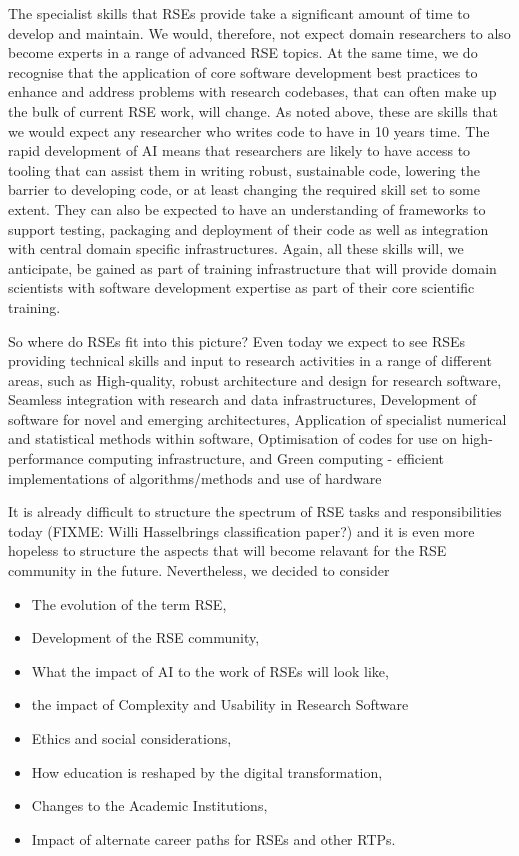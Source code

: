 \documentclass{eceasst}
\begin{document}
The specialist skills that RSEs provide take a significant amount of time to develop and maintain.
We would, therefore, not expect domain researchers to also become experts in a range of
advanced RSE topics. 
At the same time, we do recognise that the application of core software development best practices
to enhance and address problems with research codebases, that can often make up the bulk of
current RSE work, will change. As noted above, these are skills that we
would expect any researcher who writes code to have in 10 years time. 
The rapid development of AI means that researchers are likely to have access to tooling that can assist
them in writing robust, sustainable code, lowering the barrier to developing code, or at least changing the
required skill set to some extent.
They can also be expected to have an understanding of frameworks to support testing, packaging and
deployment of their code as well as integration with central domain specific infrastructures.
Again, all these skills will, we anticipate, be gained as part of training infrastructure that will
provide domain scientists with software development expertise as part of their core scientific training.

So where do RSEs fit into this picture? Even today we expect to see RSEs providing technical skills and input
to research activities in a range of different areas, such as
High-quality, robust architecture and design for research software,
Seamless integration with research and data infrastructures,
Development of software for novel and emerging architectures,
Application of specialist numerical and statistical methods within software,
Optimisation of codes for use on high-performance computing infrastructure,
and Green computing - efficient implementations of algorithms/methods and use of hardware

It is already difficult to structure the spectrum of RSE tasks and responsibilities today (FIXME: Willi Hasselbrings classification paper?)
and it is even more hopeless to structure the aspects that will become relavant for the RSE community in the future.
Nevertheless, we decided to consider
\begin{itemize}
\item The evolution of the term RSE,
\item Development of the RSE community,
\item What the impact of AI to the work of RSEs will look like,
\item the impact of Complexity and Usability in Research Software
\item Ethics and social considerations,
\item How education is reshaped by the digital transformation,
\item Changes to the Academic Institutions,
\item Impact of alternate career paths for RSEs and other RTPs.
\end{itemize}
\end{document}
